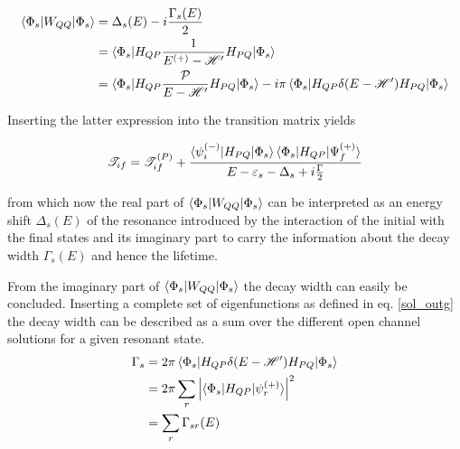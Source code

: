 \begin{align}
  \braket{\Phi_s|W_{QQ}|\Phi_s} & = \Delta_s(E) - i \frac{\Gamma_s(E)}{2}\\
                                & = \braket{\Phi_s|H_{QP}
                                    \frac{1}{E^{(+)}  - \mathscr{H}'}H_{PQ}|\Phi_s}\\
                                & = \braket{\Phi_s|H_{QP}
                                    \frac{\mathcal{P}}{E - \mathscr{H}'}H_{PQ}|\Phi_s}
                                    - i\pi \braket{\Phi_s|H_{QP}\delta(E-\mathscr{H}')H_{PQ}
                                    |\Phi_s} 
\end{align}

Inserting the latter expression into the transition matrix yields

\begin{equation}
  \mathscr{T}_{if} = \mathscr{T}_{if}^{(P)} + 
                     \frac{\braket{\psi_i^{(-)}|H_{PQ}|\Phi_s}
                           \braket{\Phi_s|H_{QP}|\Psi_f^{(+)}}}
                          {E-\varepsilon_s - \Delta_s + i \frac{\Gamma}{2}}
\end{equation}

from which now the real part of $\braket{\Phi_s|W_{QQ}|\Phi_s}$ can be interpreted 
as an energy shift $\Delta_s(E)$ of the resonance introduced by the interaction of the initial
with the final states and its imaginary part to carry the information about the
decay width $\Gamma_s(E)$ and hence the lifetime.






From the imaginary part of $\braket{\Phi_s|W_{QQ}|\Phi_s}$ the decay width can easily be concluded. Inserting a complete set
of eigenfunctions as defined in eq. \ref{sol_outg} the decay width can be described
as a sum over the different open channel solutions for a given resonant state.
\begin{align}
  \Gamma_s & = 2 \pi \braket{\Phi_s|H_{QP}\delta(E-\mathscr{H}')H_{PQ}|\Phi_s}\\
           & = 2 \pi \sum\limits_r \left | \braket{\Phi_s|H_{QP}|\psi_r^{(+)}} \right|^2\\
           & = \sum\limits_r \Gamma_{sr}(E)
\end{align}
